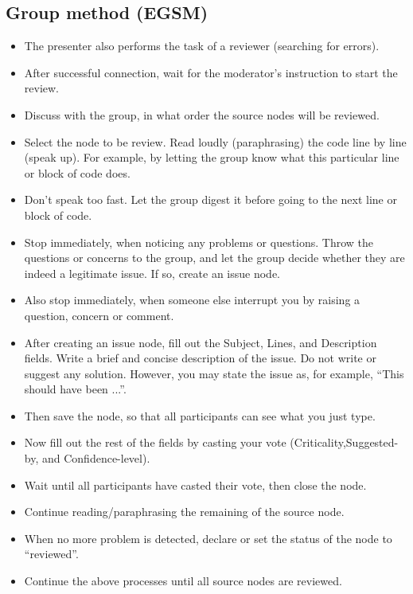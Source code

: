 \subsection*{Group method (EGSM)}
\begin{itemize}
\item The presenter also performs the task of a reviewer (searching
  for errors).
\item After successful connection, wait for the moderator's
  instruction to start the review.
\item Discuss with the group, in what order the source nodes will be
  reviewed.
\item Select the node to be review. Read loudly (paraphrasing) the
  code line by line (speak up). For example, by letting the group know
  what this particular line or block of code does.
\item Don't speak too fast. Let the group digest it before going to
  the next line or block of code.
\item Stop immediately, when noticing any problems or questions.
  Throw the questions or concerns to the group, and let the group decide
  whether they are indeed a legitimate issue. If so, create an issue
  node.
\item Also stop immediately, when someone else interrupt you by
  raising a question, concern or comment.
\item After creating an issue node, fill out the Subject, Lines, and
  Description fields. Write a brief and concise description of the
  issue. Do not write or suggest any solution. However, you may state
  the issue as, for example, ``This should have been ...''.
\item Then save the node, so that all participants can see what you
  just type.
\item Now fill out the rest of the fields by casting your vote
  (Criticality,Suggested-by, and Confidence-level).

\item Wait until all participants have casted their vote, then close
  the node.
\item Continue reading/paraphrasing the remaining of the source node.
\item When no more problem is detected, declare or set the status of
  the node to ``reviewed''.
\item Continue the above processes until all source nodes are
  reviewed.
\end{itemize}

